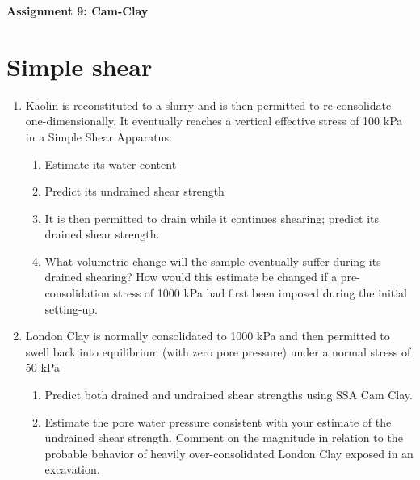 \documentclass[a4paper,12pt]{article}
\begin{document}
\begin{centering}
	\textbf{
		Assignment 9: Cam-Clay\\
	}
\end{centering}

\vspace{1em}
\section{Simple shear}

\begin{enumerate}
	
	\item Kaolin is reconstituted to a slurry and is then permitted to re-consolidate one-dimensionally. It eventually reaches a vertical effective stress of 100 kPa in a Simple Shear Apparatus:
	\begin{enumerate}
		\item Estimate its water content
		\item Predict its undrained shear strength
		\item It is then permitted to drain while it continues shearing; predict its drained shear strength.
		\item What volumetric change will the sample eventually suffer during its drained shearing? How would this estimate be changed if a pre-consolidation stress of 1000 kPa had first been imposed during the initial setting-up.
	\end{enumerate}

	\item London Clay is normally consolidated to 1000 kPa and then permitted to swell back into equilibrium (with zero pore pressure) under a normal stress of 50 kPa
	\begin{enumerate}
		\item Predict both drained and undrained shear strengths using SSA Cam Clay.
		\item Estimate the pore water pressure consistent with your estimate of the undrained shear strength. Comment on the magnitude in relation to the probable behavior of heavily over-consolidated London Clay exposed in an excavation.
	\end{enumerate}
\end{enumerate}
\end{document}
